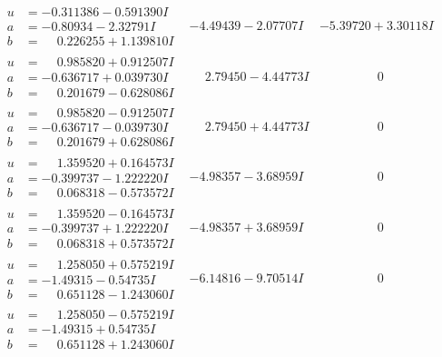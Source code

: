 \documentclass[1p]{elsarticle_modified}
\theoremstyle{definition}
\begin{document}
$$\begin{array}{c|c|c}
\begin{aligned}
u &= -0.311386 - 0.591390 I \\
a &= -0.80934 - 2.32791 I \\
b &= \phantom{-}0.226255 + 1.139810 I\end{aligned}
 & -4.49439 - 2.07707 I & -5.39720 + 3.30118 I \\ \hline\begin{aligned}
u &= \phantom{-}0.985820 + 0.912507 I \\
a &= -0.636717 + 0.039730 I \\
b &= \phantom{-}0.201679 - 0.628086 I\end{aligned}
 & \phantom{-}2.79450 - 4.44773 I & \phantom{-0.000000 } 0 \\ \hline\begin{aligned}
u &= \phantom{-}0.985820 - 0.912507 I \\
a &= -0.636717 - 0.039730 I \\
b &= \phantom{-}0.201679 + 0.628086 I\end{aligned}
 & \phantom{-}2.79450 + 4.44773 I & \phantom{-0.000000 } 0 \\ \hline\begin{aligned}
u &= \phantom{-}1.359520 + 0.164573 I \\
a &= -0.399737 - 1.222220 I \\
b &= \phantom{-}0.068318 - 0.573572 I\end{aligned}
 & -4.98357 - 3.68959 I & \phantom{-0.000000 } 0 \\ \hline\begin{aligned}
u &= \phantom{-}1.359520 - 0.164573 I \\
a &= -0.399737 + 1.222220 I \\
b &= \phantom{-}0.068318 + 0.573572 I\end{aligned}
 & -4.98357 + 3.68959 I & \phantom{-0.000000 } 0 \\ \hline\begin{aligned}
u &= \phantom{-}1.258050 + 0.575219 I \\
a &= -1.49315 - 0.54735 I \\
b &= \phantom{-}0.651128 - 1.243060 I\end{aligned}
 & -6.14816 - 9.70514 I & \phantom{-0.000000 } 0 \\ \hline\begin{aligned}
u &= \phantom{-}1.258050 - 0.575219 I \\
a &= -1.49315 + 0.54735 I \\
b &= \phantom{-}0.651128 + 1.243060 I\end{aligned}

\end{array}$$
\end{document}
